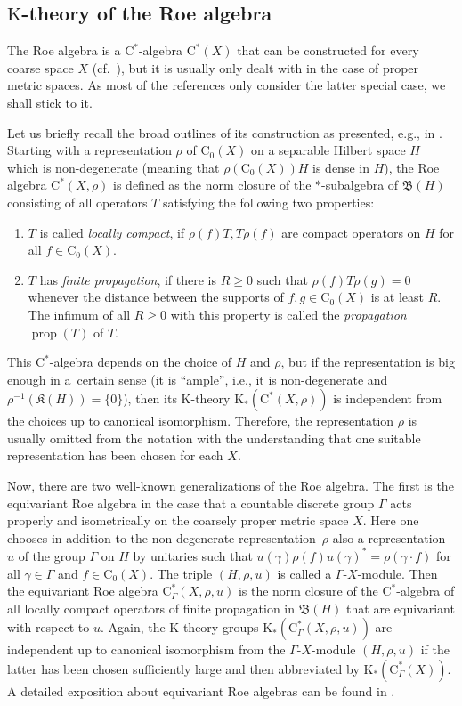 \documentclass[11pt]{article}
\numberwithin{equation}{section}
\numberwithin{equation}{section}
\theoremstyle{definition}
\newcommand{\Ct}{\mathrm{C}}
\newcommand{\Cz}{\Ct_0}
\DeclareMathOperator{\Prop}{prop}
\newcommand{\K}{\mathrm{K}}
\newcommand{\textCstar}{\ensuremath{\mathrm{C}^*\!}}
\newcommand{\Roe}{\mathrm{C}^*}
\newcommand{\Kom}{{\mathfrak{K}}}
\newcommand{\Lin}{{\mathfrak{B}}}
\begin{document}
\subsection[K-theory of the Roe algebra]{$\boldsymbol{\K}$-theory of the Roe algebra}\label{sec:RoeAlg}

The Roe algebra is a \textCstar-algebra $\Roe(X)$ that can be constructed for every coarse space $X$ (cf.\ \cite[Section~4.4]{RoeCoarseGeometry}), but it is usually only dealt with in the case of proper metric spaces. As most of the references only consider the latter special case, we shall stick to it.

Let us briefly recall the broad outlines of its construction as presented, e.g., in \cite[Section~6.3]{HigRoe}. Starting with a representation $\rho$ of $\Cz(X)$ on a separable Hilbert space $H$ which is non-degenerate (meaning that $\rho(\Cz(X))H$ is dense in $H$), the Roe algebra $\Roe(X,\rho)$ is defined as the norm closure of the $*$-subalgebra of $\Lin(H)$ consisting of all operators $T$ satisfying the following two properties:
\begin{enumerate}\itemsep=0pt
\item[$\bullet$] $T$ is called \emph{locally compact}, if $\rho(f)T,T\rho(f)$ are compact operators on $H$ for all $f\in\Cz(X)$.
\item[$\bullet$] $T$ has \emph{finite propagation}, if there is $R\geq 0$ such that $\rho(f)T\rho(g)=0$ whenever the distance between the supports of $f,g\in\Cz(X)$ is at least $R$. The infimum of all $R\geq 0$ with this property is called the \emph{propagation} $\Prop(T)$ of $T$.
\end{enumerate}
This \textCstar-algebra depends on the choice of $H$ and $\rho$, but if the representation is big enough in a~cer\-tain sense (it is \enquote{ample}, i.e., it is non-degenerate and $\rho^{-1}(\Kom(H))=\{0\}$), then its $\K$-theory $\K_*(\Roe(X,\rho))$ is independent from the choices up to canonical isomorphism.
Therefore, the representation $\rho$ is usually omitted from the notation with the understanding that one suitable representation has been chosen for each $X$.

Now, there are two well-known generalizations of the Roe algebra. The first is the equivariant Roe algebra in the case that a countable discrete group $\Gamma$ acts properly and isometrically on the coarsely proper metric space $X$. Here one chooses in addition to the non-degenerate representation~$\rho$ also a representation $u$ of the group $\Gamma$ on $H$ by unitaries such that $u(\gamma)\rho(f)u(\gamma)^*=\rho(\gamma\cdot f)$ for all $\gamma\in\Gamma$ and $f\in\Cz(X)$. The triple $(H,\rho,u)$ is called a $\Gamma$-$X$-module. Then the equivariant Roe algebra $\Roe_\Gamma(X,\rho,u)$ is the norm closure of the \textCstar-algebra of all locally compact operators of finite propagation in $\Lin(H)$ that are equivariant with respect to $u$. Again, the $\K$-theory groups $\K_*(\Roe_\Gamma(X,\rho,u))$ are independent up to canonical isomorphism from the $\Gamma$-$X$-module $(H,\rho,u)$ if the latter has been chosen sufficiently large and then abbreviated by $\K_*(\Roe_\Gamma(X))$.
A detailed exposition about equivariant Roe algebras can be found in \cite{WillettYuHigherIndexTheory}.
\end{document}
